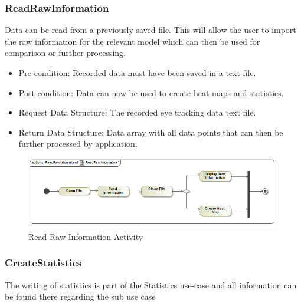 	\subsubsection{ReadRawInformation}
Data can be read from a previously saved file. This will allow the user to import the raw information for the relevant model which can then be used for comparison or further processing.
\begin{itemize}
\item Pre-condition: Recorded data must have been saved in a text file.
\item Post-condition: Data can now be used to create heat-maps and statistics.
\item Request Data Structure: The recorded eye tracking data text file.
\item Return Data Structure: Data array with all data points that can then be further processed by application.
\end{itemize}

\begin{figure}[!ht]
	\centering
	\includegraphics[scale=0.5]{Diagrams/Activity_Diagram__ReadRawInformation__ReadRawInformation.png}
	\caption{Read Raw Information Activity}
\end{figure}
	
	\subsubsection{CreateStatistics}
The writing of statistics is part of the Statistics use-case and all information can be found there regarding the sub use case

	
	
